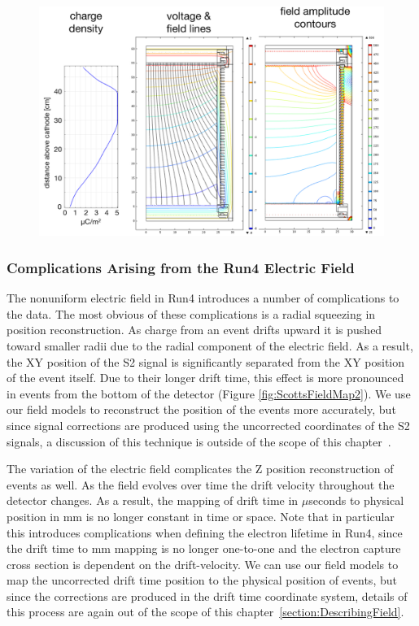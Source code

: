 \begin{figure} [!htb]
\includegraphics[scale=0.4]{Run04Corrections/Sep2014_Field_Detailed.png}
\label{fig:ScottsFieldMap}
\end{figure}

\subsubsection{Complications Arising from the Run4 Electric Field} \label{section:NEST}

The nonuniform electric field in Run4 introduces a number of complications to the data.  The most obvious of these complications is a radial squeezing in position reconstruction.  As charge from an event drifts upward it is pushed toward smaller radii due to the radial component of the electric field.  As a result, the XY position of the S2 signal is significantly separated from the XY position of the event itself.  Due to their longer drift time, this effect is more pronounced in events from the bottom of the detector (Figure \ref{fig:ScottsFieldMap2}). We use our field models to reconstruct the position of the events more accurately, but since signal corrections are produced using the uncorrected coordinates of the S2 signals, a discussion of this technique is outside of the scope of this chapter~\cite{PositionRecon}.

The variation of the electric field complicates the Z position reconstruction of events as well.  As the field evolves over time the drift velocity throughout the detector changes.  As a result, the mapping of drift time in $\mu$seconds to physical position in mm is no longer constant in time or space. Note that in particular this introduces complications when defining the electron lifetime in Run4, since the drift time to mm mapping is no longer one-to-one and the electron capture cross section is dependent on the drift-velocity.  We can use our field models to map the uncorrected drift time position to the physical position of events, but since the corrections are produced in the drift time coordinate system, details of this process are again out of the scope of this chapter~\ref{section:DescribingField}.  

